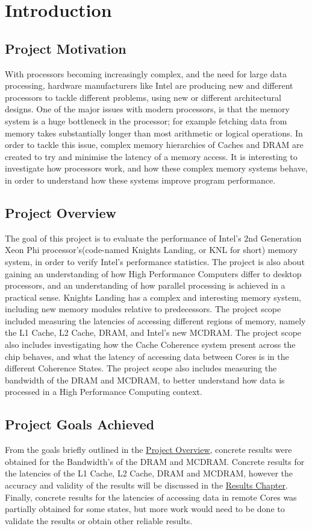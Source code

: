 \documentclass[bsc,frontabs,twoside,singlespacing,parskip,deptreport]{infthesis}     %
\begin{document}

\chapter{Introduction}
\section{Project Motivation}
With processors becoming increasingly complex, and the need for large data processing, hardware manufacturers like Intel are producing new and different processors to tackle different problems, using new or different architectural designs. One of the major issues with modern processors, is that the memory system is a huge bottleneck in the processor; for example fetching data from memory takes substantially longer than most arithmetic or logical operations. In order to tackle this issue, complex memory hierarchies of Caches and DRAM are created to try and minimise the latency of a memory access. It is interesting to investigate how processors work, and how these complex memory systems behave, in order to understand how these systems improve program performance.

\section{Project Overview}\label{proj-overview}
The goal of this project is to evaluate the performance of Intel's 2nd Generation Xeon Phi processor's(code-named Knights Landing, or KNL for short) memory system, in order to verify Intel's performance statistics. The project is also about gaining an understanding of how High Performance Computers differ to desktop processors, and an understanding of how parallel processing is achieved in a practical sense. Knights Landing has a complex and interesting memory system, including new memory modules relative to predecessors. The project scope included measuring the latencies of accessing different regions of memory, namely the L1 Cache, L2 Cache, DRAM, and Intel's new MCDRAM. The project scope also includes investigating how the Cache Coherence system present across the chip behaves, and what the latency of accessing data between Cores is in the different Coherence States. The project scope also includes measuring the bandwidth of the DRAM and MCDRAM, to better understand how data is processed in a High Performance Computing context.

\section{Project Goals Achieved}
From the goals briefly outlined in the \hyperref[proj-overview]{Project Overview}, concrete results were obtained for the Bandwidth's of the DRAM and MCDRAM. Concrete results for the latencies of the L1 Cache, L2 Cache, DRAM and MCDRAM, however the accuracy and validity of the results will be discussed in the \hyperref[chap:conclusion]{Results Chapter}. Finally, concrete results for the latencies of accessing data in remote Cores was partially obtained for some states, but more work would need to be done to validate the results or obtain other reliable results.
\end{document}
